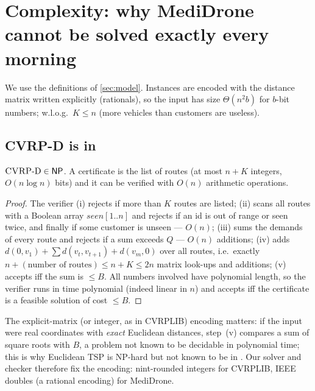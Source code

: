 \section{Complexity: why MediDrone cannot be solved exactly every morning}
\label{sec:theory}
We use the definitions of \cref{sec:model}. Instances are encoded with the
distance matrix written explicitly (rationals), so the input has size
$\Theta(n^2 b)$ for $b$-bit numbers; w.l.o.g.\ $K\le n$ (more vehicles than
customers are useless).

\subsection{CVRP-D is in \NP}
\begin{theorem}\label{thm:np}
$\textsc{CVRP}\text{-D}\in\textsf{NP}$. A certificate is the list of routes (at most $n+K$ integers,
$O(n\log n)$ bits) and it can be verified with $O(n)$ arithmetic operations.
\end{theorem}
\begin{proof}
The verifier (i) rejects if more than $K$ routes are listed; (ii) scans all routes with a
Boolean array $\mathit{seen}[1..n]$ and rejects if an id is out of range or seen twice,
and finally if some customer is unseen --- $O(n)$; (iii) sums the demands of every route and
rejects if a sum exceeds $Q$ --- $O(n)$ additions; (iv) adds $d(0,v_1)+\sum d(v_t,v_{t+1})+d(v_m,0)$
over all routes, i.e.\ exactly $n+(\text{number of routes})\le n+K\le 2n$ matrix look-ups and
additions; (v) accepts iff the sum is $\le B$. All numbers involved have polynomial length,
so the verifier runs in time polynomial (indeed linear in $n$) and accepts iff the
certificate is a feasible solution of cost $\le B$.
\end{proof}
\begin{remark}
The explicit-matrix (or integer, as in CVRPLIB) encoding matters: if the input were real
coordinates with \emph{exact} Euclidean distances, step~(v) compares a sum of square roots with
$B$, a problem not known to be decidable in polynomial time; this is why Euclidean TSP is
NP-hard but not known to be in \NP{} \citep{garey1976some}. Our solver and checker therefore
fix the encoding: nint-rounded integers for CVRPLIB, IEEE doubles (a rational encoding) for
MediDrone.
\end{remark}

